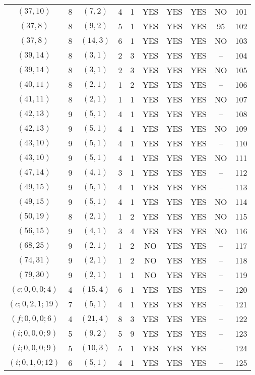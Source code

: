 \begin{longtable}{|c|c|c|c|c|c|c|c|c|c|}
$(37, 10)$ & 8 & $(7, 2)$ & 4 & 1 & YES & YES & YES & NO & 101\\
$(37, 8)$ & 8 & $(9, 2)$ & 5 & 1 & YES & YES & YES & 95 & 102\\
$(37, 8)$ & 8 & $(14, 3)$ & 6 & 1 & YES & YES & YES & NO & 103\\
$(39, 14)$ & 8 & $(3, 1)$ & 2 & 3 & YES & YES & YES & -- & 104\\
$(39, 14)$ & 8 & $(3, 1)$ & 2 & 3 & YES & YES & YES & NO & 105\\
$(40, 11)$ & 8 & $(2, 1)$ & 1 & 2 & YES & YES & YES & -- & 106\\
$(41, 11)$ & 8 & $(2, 1)$ & 1 & 1 & YES & YES & YES & NO & 107\\
$(42, 13)$ & 9 & $(5, 1)$ & 4 & 1 & YES & YES & YES & -- & 108\\
$(42, 13)$ & 9 & $(5, 1)$ & 4 & 1 & YES & YES & YES & NO & 109\\
$(43, 10)$ & 9 & $(5, 1)$ & 4 & 1 & YES & YES & YES & -- & 110\\
$(43, 10)$ & 9 & $(5, 1)$ & 4 & 1 & YES & YES & YES & NO & 111\\
$(47, 14)$ & 9 & $(4, 1)$ & 3 & 1 & YES & YES & YES & -- & 112\\
$(49, 15)$ & 9 & $(5, 1)$ & 4 & 1 & YES & YES & YES & -- & 113\\
$(49, 15)$ & 9 & $(5, 1)$ & 4 & 1 & YES & YES & YES & NO & 114\\
$(50, 19)$ & 8 & $(2, 1)$ & 1 & 2 & YES & YES & YES & NO & 115\\
$(56, 15)$ & 9 & $(4, 1)$ & 3 & 4 & YES & YES & YES & NO & 116\\
$(68, 25)$ & 9 & $(2, 1)$ & 1 & 2 & NO & YES & YES & -- & 117\\
$(74, 31)$ & 9 & $(2, 1)$ & 1 & 2 & NO & YES & YES & -- & 118\\
$(79, 30)$ & 9 & $(2, 1)$ & 1 & 1 & NO & YES & YES & -- & 119\\
$(c; 0, 0, 0; 4)$ & 4 & $(15, 4)$ & 6 & 1 & YES & YES & YES & -- & 120\\
$(c; 0, 2, 1; 19)$ & 7 & $(5, 1)$ & 4 & 1 & YES & YES & YES & -- & 121\\
$(f; 0, 0, 0; 6)$ & 4 & $(21, 4)$ & 8 & 3 & YES & YES & YES & -- & 122\\
$(i; 0, 0, 0; 9)$ & 5 & $(9, 2)$ & 5 & 9 & YES & YES & YES & -- & 123\\
$(i; 0, 0, 0; 9)$ & 5 & $(10, 3)$ & 5 & 1 & YES & YES & YES & -- & 124\\
$(i; 0, 1, 0; 12)$ & 6 & $(5, 1)$ & 4 & 1 & YES & YES & YES & -- & 125
\end{longtable}
